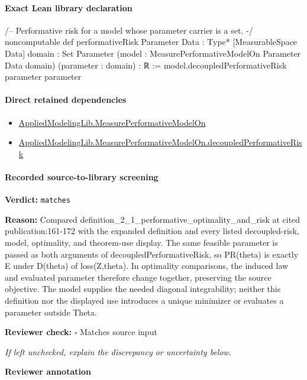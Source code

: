 \documentclass[10pt]{article}
\newcommand{\reviewerbox}{%
  \par\noindent\fbox{\parbox{0.96\linewidth}{\rule{0pt}{0.38in}}}\par
}
\newcommand{\reviewmatch}[1]{%
  \par\noindent\textbf{Reviewer check:} $\square$\; #1\par
  \noindent\emph{If left unchecked, explain the discrepancy or uncertainty below.}\par
}
\begin{document}
\paragraph{Exact Lean library declaration}
\begin{ReviewVerbatim}
/-- Performative risk for a model whose parameter carrier is a set. -/
noncomputable def performativeRisk
    {Parameter Data : Type*} [MeasurableSpace Data] {domain : Set Parameter}
    (model : MeasurePerformativeModelOn Parameter Data domain)
    (parameter : domain) : ℝ :=
  model.decoupledPerformativeRisk parameter parameter
\end{ReviewVerbatim}

\paragraph{Direct retained dependencies}
\begin{itemize}\raggedright
\item \hyperlink{library-prerequisite-e14cc5e8b1e1460e}{Applied\allowbreak{}Modeling\allowbreak{}Lib.\allowbreak{}Measure\allowbreak{}Performative\allowbreak{}Model\allowbreak{}On}
\item \hyperlink{library-prerequisite-25221c4f931beacb}{Applied\allowbreak{}Modeling\allowbreak{}Lib.\allowbreak{}Measure\allowbreak{}Performative\allowbreak{}Model\allowbreak{}On.\allowbreak{}decoupled\allowbreak{}Performative\allowbreak{}Risk}
\end{itemize}
\paragraph{Recorded source-to-library screening}
\textbf{Verdict:} \texttt{matches}
\\
{\raggedright
\textbf{Reason:} Compared definition\_\allowbreak{}2\_\allowbreak{}1\_\allowbreak{}performative\_\allowbreak{}optimality\_\allowbreak{}and\_\allowbreak{}risk at cited publication:\allowbreak{}161-\allowbreak{}172 with the expanded definition and every listed decoupled-\allowbreak{}risk, model, optimality, and theorem-\allowbreak{}use display.\allowbreak{} The same feasible parameter is passed as both arguments of decoupledPerformativeRisk, so PR(theta) is exactly E under D(theta) of loss(Z,theta).\allowbreak{} In optimality comparisons, the induced law and evaluated parameter therefore change together, preserving the source objective.\allowbreak{} The model supplies the needed diagonal integrability;\allowbreak{} neither this definition nor the displayed use introduces a unique minimizer or evaluates a parameter outside Theta.\allowbreak{}
\par}
\reviewmatch{Matches source input}
\noindent\textbf{Reviewer annotation}\par
\reviewerbox
\clearpage
\hypertarget{library-prerequisite-555f831d5bfa2a27}{}
\end{document}
